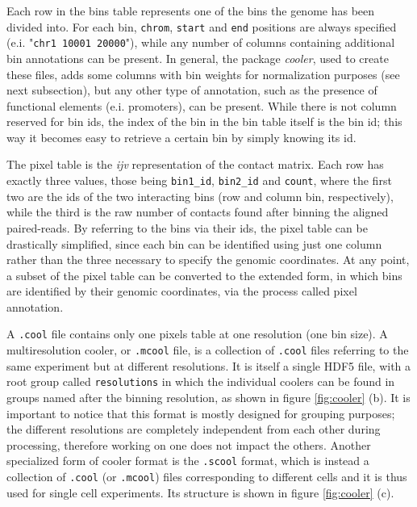 Each row in the bins table represents one of the bins the genome has been divided into. For each bin, \texttt{chrom}, \texttt{start} and \texttt{end} positions are always specified (e.i. "\texttt{chr1  10001  20000}"), while any number of columns containing additional bin annotations can be present. In general, the package \emph{cooler}, used to create these files, adds some columns with bin weights for normalization purposes (see next subsection), but any other type of annotation, such as the presence of functional elements (e.i. promoters), can be present. While there is not column reserved for bin ids, the index of the bin in the bin table itself is the bin id; this way it becomes easy to retrieve a certain bin by simply knowing its id.

The pixel table is the \emph{ijv} representation of the contact matrix. Each row has exactly three values, those being \texttt{bin1\_id}, \texttt{bin2\_id} and \texttt{count}, where the first two are the ids of the two interacting bins (row and column bin, respectively), while the third is the raw number of contacts found after binning the aligned paired-reads. By referring to the bins via their ids, the pixel table can be drastically simplified, since each bin can be identified using just one column rather than the three necessary to specify the genomic coordinates. At any point, a subset of the pixel table can be converted to the extended form, in which bins are identified by their genomic coordinates, via the process called pixel annotation.

A \texttt{.cool} file contains only one pixels table at one resolution (one bin size). A multiresolution cooler, or \texttt{.mcool} file, is a collection of \texttt{.cool} files referring to the same experiment but at different resolutions. It is itself a single HDF5 file, with a root group called \texttt{resolutions} in which the individual coolers can be found in groups named after the binning resolution, as shown in figure \ref{fig:cooler} (b). It is important to notice that this format is mostly designed for grouping purposes; the different resolutions are completely independent from each other during processing, therefore working on one does not impact the others. Another specialized form of cooler format is the \texttt{.scool} format, which is instead a collection of \texttt{.cool} (or \texttt{.mcool}) files corresponding to different cells and it is thus used for single cell experiments. Its structure is shown in figure \ref{fig:cooler} (c).

